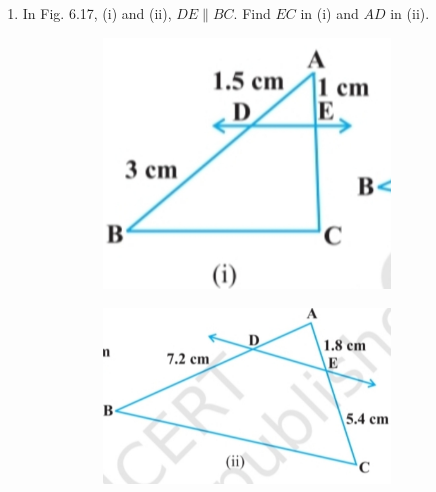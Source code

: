\documentclass[a4paper,12pt]{article}
\begin{document}
\begin{enumerate}

\item In Fig. 6.17, (i) and (ii), $DE \parallel BC$. Find $EC$ in (i) and $AD$ in (ii).

\begin{figure}[h!]
\centering
\begin{subfigure}{0.45\textwidth}
    \centering
    \includegraphics[width=0.9\textwidth]{a0.jpg}
   
\end{subfigure}
\hfill
\begin{subfigure}{0.45\textwidth}
    \centering
    \includegraphics[width=0.9\textwidth]{a1.jpg}
   
\end{subfigure}
\end{figure}


\end{enumerate}
\end{document}
